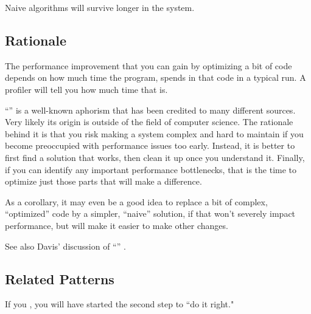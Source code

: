 \documentclass[a4paper,10pt,twoside]{book}
\begin{document}
\begin{bulletlist}
\item Naive algorithms will survive longer in the system.
\end{bulletlist}

\subsection*{Rationale}

The performance improvement that you can gain by optimizing a bit of code depends on how much time the program, spends in that code in a typical run. A profiler will tell you how much time that is.

``'' is a well-known aphorism that has been credited to many different sources. Very likely its origin is outside of the field of computer science. The rationale behind it is that you risk making a system complex and hard to maintain if you become preoccupied with performance issues too early. Instead, it is better to first find a solution that works, then clean it up once you understand it. Finally, if you can identify any important performance bottlenecks, that is the time to optimize just those parts that will make a difference.

As a corollary, it may even be a good idea to replace a bit of complex, ``optimized'' code by a simpler, ``naive'' solution, if that won't severely impact performance, but will make it easier to make other changes. 

See also Davis' discussion of ``'' \cite{Davi95a}.

\subsection*{Related Patterns}

If you , you will have started the second step to ``do it right."

\ifx\wholebook\relax\else
   
   
   
\end{document}
